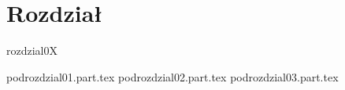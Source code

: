 \chapter{Rozdział}
rozdzial0X

{podrozdzial01.part.tex}
{podrozdzial02.part.tex}
{podrozdzial03.part.tex}
